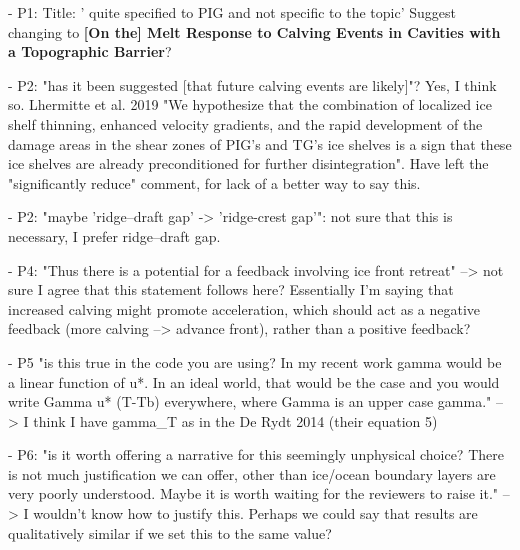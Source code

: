 - P1: Title: ' quite specified to PIG and not specific to the topic' 
	Suggest changing to \textbf{[On the] Melt Response to Calving Events in Cavities with a Topographic Barrier}? 
	
- P2: "has it been suggested [that future calving events are likely]"? 
    Yes, I think so. Lhermitte et al. 2019 "We hypothesize that the combination of localized ice shelf thinning, enhanced velocity gradients, and the rapid development of the damage areas in the shear zones of PIG’s and TG’s ice shelves is a sign that these ice shelves are already preconditioned for further disintegration". Have left the "significantly reduce" comment, for lack of a better way to say this.
    
- P2: "maybe 'ridge--draft gap' -> 'ridge-crest gap'": not sure that this is necessary, I prefer ridge--draft gap.

- P4: "Thus there is a potential for a feedback involving ice front retreat" --> not sure I agree that this statement follows here? Essentially I'm saying that increased calving might promote acceleration, which should act as a negative feedback (more calving --> advance front), rather than a positive feedback?

- P5 "is this true in the code you are using?  In my recent work gamma would be a linear function of u*.  In an ideal world, that would be the case and you would write Gamma u* (T-Tb) everywhere, where Gamma is an upper case gamma." --> I think I have gamma_T as in the De Rydt 2014 (their equation 5)

- P6: "is it worth offering a narrative for this seemingly unphysical choice?  There is not much justification we can offer, other than ice/ocean boundary layers are very poorly understood.  Maybe it is worth waiting for the reviewers to raise it." --> I wouldn't know how to justify this. Perhaps we could say that results are qualitatively similar if we set this to the same value?

